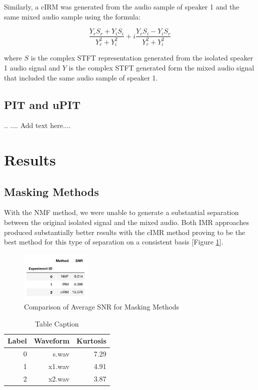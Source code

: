 \documentclass[journal, a4paper]{IEEEtran}
\begin{document}
Similarly, a cIRM was generated from the audio sample of speaker 1 and the same mixed audio sample using the formula:

\[
\dfrac{Y_r S_r + Y_i S_i}{Y_r^2 + Y_i^2} +
i\dfrac{Y_r S_i - Y_i S_r}{Y_r^2 + Y_i^2}
\]

\begin{flushleft}
where $S$ is the complex STFT representation generated from the isolated speaker 1 audio signal and $Y$ is the complex STFT generated form the mixed audio signal that included the same audio sample of speaker 1.\cite{DBLP:journals/corr/abs-1708-07524}
\end{flushleft}

\subsection{PIT and uPIT}

..
.... Add text here....


\section{Results}

\subsection{Masking Methods}

With the NMF method, we were unable to generate a substantial separation between the original isolated signal and the mixed audio. Both IMR approaches produced substantially better results with the cIMR method proving to be the best method for this type of separation on a consistent basis [Figure \ref{tab:masking_snr}].


\begin{figure}[h!]
    \centering  
     \caption{\label{Fig:Comparison of Average SNR for Masking Methods 1}Comparison of Average SNR for Masking Methods}  
    \includegraphics[width=0.3\textwidth]{Mask_Res.png}  
\end{figure}

\begin{table}[h]
    \centering
    \begin{tabular}{r r r}
        Label &Waveform & Kurtosis \\

        \midrule
        0 & s.wav & 7.29 \\
        1 & x1.wav & 4.91 \\
        2 & x2.wav & 3.87 \\
        \midrule
    \end{tabular}
    \caption{Table Caption}
    \label{tab:masking_snr}
\end{table}
\end{document}
